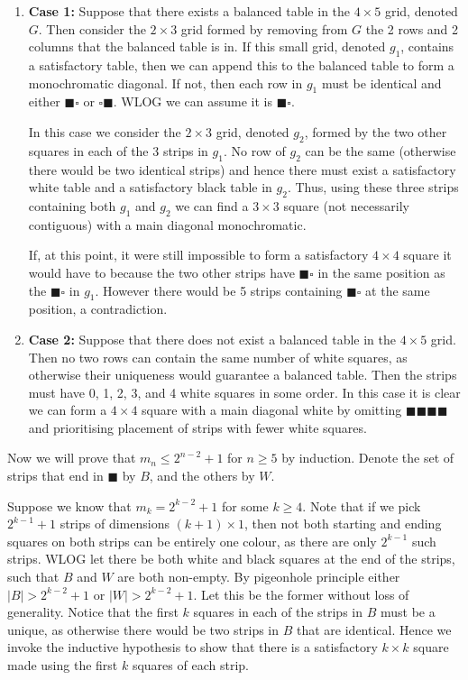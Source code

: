 \documentclass[10pt]{article}
\newcommand{\ws}{\square}
\newcommand{\bs}{\blacksquare}
\begin{document}
	\begin{enumerate}
	\item \textbf{Case 1:} Suppose that there exists a balanced table in the \(4 \times 5\) grid, denoted \(G\). Then consider the \(2 \times 3\) grid formed by removing from \(G\) the 2 rows and 2 columns that the balanced table is in. If this small grid, denoted \(g_1\), contains a satisfactory table, then we can append this to the balanced table to form a monochromatic diagonal. If not, then each row in \(g_1\) must be identical and either \(\bs \ws\) or \(\ws \bs\). WLOG we can assume it is \(\bs \ws\).
	
	In this case we consider the \(2 \times 3\) grid, denoted \(g_2\), formed by the two other squares in each of the 3 strips in \(g_1\). No row of \(g_2\) can be the same (otherwise there would be two identical strips) and hence there must exist a satisfactory white table and a satisfactory black table in \(g_2\). Thus, using these three strips containing both \(g_1\) and \(g_2\) we can find a \(3 \times 3\) square (not necessarily contiguous) with a main diagonal monochromatic.
	
	If, at this point, it were still impossible to form a satisfactory \(4 \times 4\) square it would have to because the two other strips have \(\bs \ws\) in the same position as the \(\bs \ws\) in \(g_1\). However there would be 5 strips containing \(\bs \ws\) at the same position, a contradiction.
	\item \textbf{Case 2:} Suppose that there does not exist a balanced table in the \(4 \times 5\) grid. Then no two rows can contain the same number of white squares, as otherwise their uniqueness would guarantee a balanced table. Then the strips must have 0, 1, 2, 3, and 4 white squares in some order. In this case it is clear we can form a \(4 \times 4\) square with a main diagonal white by omitting \(\bs \bs \bs \bs\) and prioritising placement of strips with fewer white squares.
	\end{enumerate}
	
	Now we will prove that \(m_n \leq 2^{n-2} + 1\) for \(n \geq 5\) by induction. Denote the set of strips that end in \(\bs\) by \(B\), and the others by \(W\).
	
	Suppose we know that \(m_k = 2^{k-2} + 1\) for some \(k \geq 4\). Note that if we pick \(2^{k-1}+1\) strips of dimensions \((k+1) \times 1\), then not both starting and ending squares on both strips can be entirely one colour, as there are only \(2^{k-1}\) such strips. WLOG let there be both white and black squares at the end of the strips, such that \(B\) and \(W\) are both non-empty. By pigeonhole principle either \(|B| > 2^{k-2} + 1\) or \(|W| > 2^{k-2}+1\). Let this be the former without loss of generality. Notice that the first \(k\) squares in each of the strips in \(B\) must be a unique, as otherwise there would be two strips in \(B\) that are identical. Hence we invoke the inductive hypothesis to show that there is a satisfactory \(k \times k\) square made using the first \(k\) squares of each strip.
	
\end{document}
